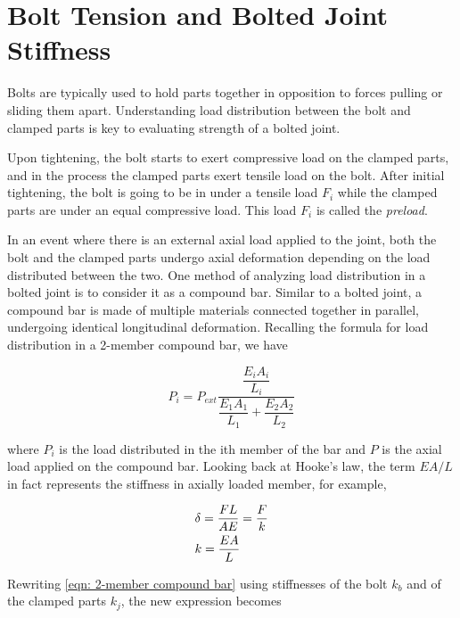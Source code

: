 \documentclass[
10pt,
a4paper,
openany,
svgnames,
]{book}
\begin{document}
\section{Bolt Tension and Bolted Joint Stiffness}

Bolts are typically used to hold parts together in opposition to forces pulling or sliding them apart. Understanding load distribution between the bolt and clamped parts is key to evaluating strength of a bolted joint.

Upon tightening, the bolt starts to exert compressive load on the clamped parts, and in the process the clamped parts exert tensile load on the bolt. After initial tightening, the bolt is going to be in under a tensile load $F_i$ while the clamped parts are under an equal compressive load. This load $F_i$ is called the \emph{preload}.

In an event where there is an external axial load applied to the joint, both the bolt and the clamped parts undergo axial deformation depending on the load distributed between the two. One method of analyzing load distribution in a bolted joint is to consider it as a compound bar. Similar to a bolted joint, a compound bar is made of multiple materials connected together in parallel, undergoing identical longitudinal deformation. Recalling the formula for load distribution in a 2-member compound bar, we have

\begin{equation} \label{eqn: 2-member compound bar}
  P_i = P_{ext}\frac{\dfrac{E_iA_i}{L_i}}{\dfrac{E_1A_1}{L_1} + \dfrac{E_2A_2}{L_2}}
\end{equation}

where $P_i$ is the load distributed in the ith member of the bar and $P$ is the axial load applied on the compound bar. Looking back at Hooke’s law, the term $EA/L$ in fact represents the stiffness in axially loaded member, for example,

\[\begin{gathered}
  \delta  = \frac{FL}{AE} = \frac{F}{k} \hfill \\
  k = \frac{EA}{L} \hfill \\ 
\end{gathered} \]

Rewriting \cref{eqn: 2-member compound bar} using stiffnesses of the bolt $k_b$ and of the clamped parts $k_j$, the new expression becomes
\end{document}
